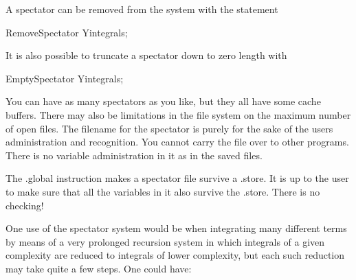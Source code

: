 \noindent
A spectator can be removed from the system with the 
statement

\begin{minipage}{10cm}
    RemoveSpectator Yintegrals;
\end{minipage}

\noindent
It is also possible to truncate a spectator down to zero length 
with

\begin{minipage}{10cm}
    EmptySpectator Yintegrals;
\end{minipage}

\noindent
You can have as many spectators as you like, but they all have some cache 
buffers. There may also be limitations in the file system on the maximum 
number of open files. The filename for the spectator is purely for the sake 
of the users administration and recognition. You cannot carry the file over 
to other programs. There is no variable administration in it as in the 
saved files.

\noindent
The .global instruction makes a spectator file survive a .store. It is up 
to the user to make sure that all the variables in it also survive the 
.store. There is no checking!

\noindent
One use of the spectator system would be when integrating many different 
terms by means of a very prolonged recursion system in which integrals of a 
given complexity are reduced to integrals of lower complexity, but each 
such reduction may take quite a few steps. One could have:

